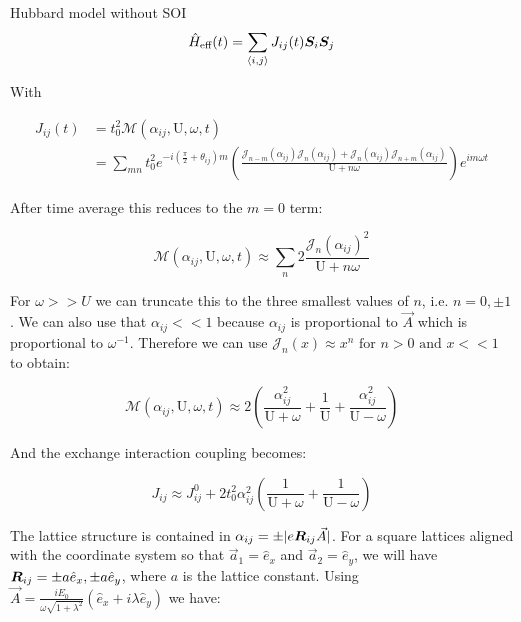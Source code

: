 \begin{section}{Hubbard model without SOI}
\begin{equation}
\hat{H}_{\text{eff}}(t) = \sum_{\langle i,j \rangle} J_{ij}(t) \boldsymbol{S}_i \boldsymbol{S}_j
\end{equation}

With 

\begin{align}
J_{ij}(t) &= t_0^2 \mathcal{M}(\alpha_{ij}, \text{U}, \omega, t) \nonumber \\
&=\sum_{mn} t_0^2 e^{-i(\frac{\pi}{2}+\theta_{ij})m}\left(\frac{\mathcal{J}_{n-m}(\alpha_{ij})\mathcal{J}_{n}(\alpha_{ij})+\mathcal{J}_{n}(\alpha_{ij})\mathcal{J}_{n+m}(\alpha_{ij})}{\text{U}+n\omega} \right) e^{im\omega t} \label{Jij1}
\end{align}

After time average this reduces to the $m=0$ term:

\begin{equation}
\mathcal{M}(\alpha_{ij}, \text{U}, \omega, t) \approx \sum_{n} 2 \frac{\mathcal{J}_n(\alpha_{ij})^2}{\text{U}+n\omega}
\end{equation}

For $\omega>>U$ we can truncate this to the three smallest values of $n$, i.e. $n=0, \pm 1$. We can also use that $\alpha_{ij} << 1$ because $\alpha_{ij}$ is proportional to $\vec{A}$ which is proportional to $\omega^{-1}$. Therefore we can use $\mathcal{J}_n(x) \approx x^n \text{ for } n>0 \text{ and } x << 1$ to obtain:

\begin{equation}
\label{MFactorApprox}
\mathcal{M}(\alpha_{ij}, \text{U}, \omega, t) \approx 2 \left(\frac{\alpha_{ij}^2}{\text{U}+\omega} +\frac{1}{\text{U}} +\frac{\alpha_{ij}^2}{\text{U}-\omega} \right)
\end{equation}

And the exchange interaction coupling becomes:

\begin{equation}
\label{Jij2}
J_{ij} \approx J_{ij}^0 + 2t_0^2 \alpha_{ij}^2 \left( \frac{1}{\text{U}+\omega} + \frac{1}{\text{U}-\omega} \right)
\end{equation}

The lattice structure is contained in $\alpha_{ij} = \pm|e\boldsymbol{R}_{ij}\vec{A}|$. For a square lattices aligned with the coordinate system so that $\vec{a}_1=\hat{e}_x$ and $\vec{a}_2=\hat{e}_y$, we will have $\boldsymbol{R}_{ij} = \pm a\hat{e}_x,\pm a\hat{e}_y$, where $a$ is the lattice constant. Using $\vec{A}=\frac{iE_0}{\omega\sqrt{1+\lambda^2}}(\hat{e}_x+i\lambda\hat{e}_y)$ we have:


\end{section}
